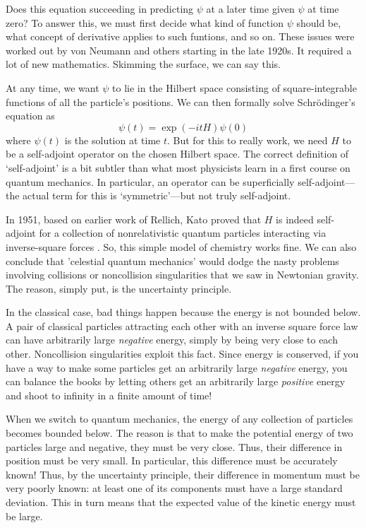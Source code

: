 \documentclass[12pt]{article}
\begin{document}
Does this equation succeeding in predicting $\psi$ at a later time given $\psi$ at time zero?  To answer this, we must first decide what kind of function $\psi$ should be, what concept of derivative applies to such funtions, and so on.  These issues were worked out by von Neumann and others starting in the late 1920s.    It required a lot of new mathematics.   Skimming the surface, we can say this.

At any time, we want $\psi$ to lie in the Hilbert space consisting of square-integrable functions of all the particle's positions.   We can then formally solve Schr\"odinger's equation as
$$  \psi(t) = \exp(-i t H) \psi(0) $$
where $\psi(t)$ is the solution at time $t$.  But for this to really work, we need $H$ to be a self-adjoint operator on the chosen Hilbert space.  The correct definition of `self-adjoint' is a bit subtler than what most physicists learn in a first course on quantum mechanics.  In particular, an operator can be superficially self-adjoint---the actual term for this is `symmetric'---but not truly self-adjoint.  

In 1951, based on earlier work of Rellich, Kato proved that $H$ is indeed self-adjoint for a collection of nonrelativistic quantum particles interacting via inverse-square forces \cite{Kato,Rellich}.   So, this simple model of chemistry works fine.  We can also conclude that 'celestial quantum mechanics' would dodge the nasty problems involving collisions or noncollision singularities that we saw in Newtonian gravity.   The reason, simply put, is the uncertainty principle.  

In the classical case, bad things happen because the energy is not bounded below.  A pair of classical particles attracting each other with an inverse square force law can have arbitrarily large \emph{negative} energy, simply by being very close to each other.   Noncollision singularities exploit this fact.  Since energy is conserved, if you have a way to make some particles get an arbitrarily large \emph{negative} energy, you can balance the books by letting others get an arbitrarily large \emph{positive} energy and shoot to infinity in a finite amount of time!

When we switch to quantum mechanics, the energy of any collection of particles becomes bounded below.  The reason is that to make the potential energy of two particles large and negative, they must be very close.  Thus, their difference in position must be very small.  In particular, this difference must be accurately known!  Thus, by the uncertainty principle, their difference in momentum must be very poorly known: at least one of its components must have a large standard deviation.   This in turn means that the expected value of the kinetic energy must be large.
\end{document}
